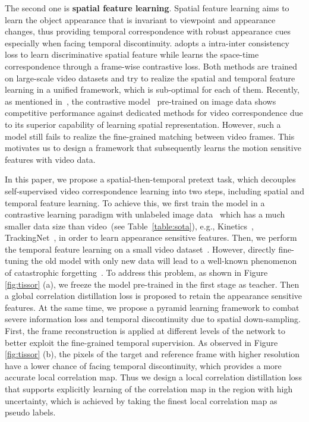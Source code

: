 \documentclass{article}
\begin{document}
The second one is \textbf{spatial feature learning}. Spatial feature learning aims to learn the object appearance that is invariant to viewpoint and appearance changes, thus providing temporal correspondence with robust appearance cues especially when facing temporal  discontinuity. \cite{wang2020contrastive} adopts a intra-inter consistency loss to learn  discriminative spatial feature while \cite{xu2021rethinking} learns the space-time correspondence through a frame-wise contrastive loss. Both methods are trained on large-scale video datasets and try to realize the spatial and temporal feature learning in a unified framework, which is sub-optimal for each of them. Recently, as mentioned in~\cite{wang2021different}, the contrastive model~\cite{he2020momentum}\cite{xie2021detco} pre-trained on image data shows competitive performance against dedicated methods for video correspondence due to its superior capability of learning spatial representation. However, such a model still fails to realize the fine-grained matching between video frames. This motivates us to design a framework that subsequently learns the motion sensitive features with video data.

In this paper, we propose a spatial-then-temporal pretext task, which decouples self-supervised video correspondence learning into two steps, including spatial and temporal feature learning. To achieve this, we first train the model in a contrastive learning paradigm with unlabeled image data~\cite{deng2009imagenet} which has a much smaller data size than video~(see Table~\ref{table:sota}), e.g., Kinetics~\cite{carreira2017quo}, TrackingNet~\cite{muller2018trackingnet}, in order to learn appearance sensitive features. Then, we perform the temporal feature learning on a small video dataset~\cite{xu2018youtube}.  However, directly fine-tuning the old model with only new data will lead to a well-known phenomenon of catastrophic forgetting~\cite{li2017learning}. To address this problem, as shown in Figure \ref{fig:tissor} (a), we freeze the model pre-trained in the first stage  as teacher. Then a global correlation distillation loss is proposed to retain the appearance sensitive features. At the same time, we propose a pyramid learning framework to combat severe information loss and temporal discontinuity due to spatial down-sampling. First, the frame reconstruction is applied at different levels of the network to better exploit the fine-grained temporal supervision. As observed in Figure \ref{fig:tissor} (b), the pixels of the target and reference frame with higher resolution have a lower chance of facing temporal discontinuity, which provides a more accurate local correlation map. Thus we design a local correlation distillation loss that supports explicitly learning of the correlation map in the region with high uncertainty, which is achieved by taking the finest local correlation map as pseudo labels. 
\end{document}
